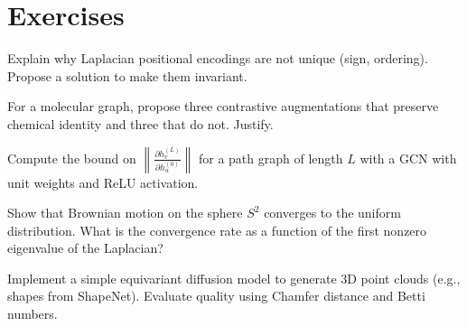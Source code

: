 \section{Exercises}

\begin{exercise}
Explain why Laplacian positional encodings are not unique (sign,
ordering). Propose a solution to make them invariant.
\end{exercise}

\begin{exercise}
For a molecular graph, propose three contrastive augmentations
that preserve chemical identity and three that do not. Justify.
\end{exercise}

\begin{exercise}
Compute the bound on $\left\|\frac{\partial h_v^{(L)}}
{\partial h_u^{(0)}}\right\|$ for a path graph of length $L$
with a GCN with unit weights and ReLU activation.
\end{exercise}

\begin{exercise}
Show that Brownian motion on the sphere $S^2$ converges to the
uniform distribution. What is the convergence rate as a function
of the first nonzero eigenvalue of the Laplacian?
\end{exercise}

\begin{exercise}[Project]
Implement a simple equivariant diffusion model to generate 3D point
clouds (e.g., shapes from ShapeNet). Evaluate quality using Chamfer
distance and Betti numbers.
\end{exercise}
